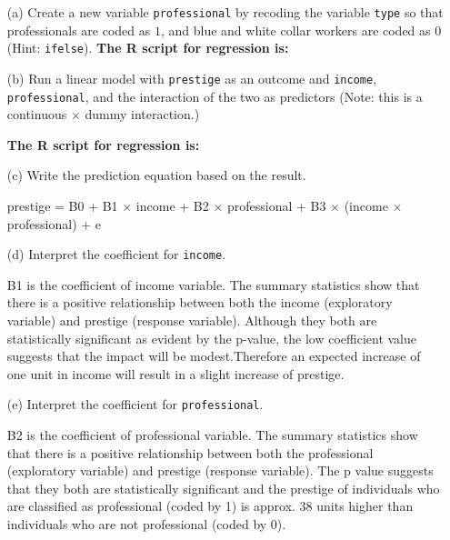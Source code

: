 \documentclass[12pt,letterpaper]{article}
\begin{document}
\newpage
\begin{enumerate}
	
	\item [(a)]
	Create a new variable \texttt{professional} by recoding the variable \texttt{type} so that professionals are coded as $1$, and blue and white collar workers are coded as $0$ (Hint: \texttt{ifelse}).
	\textbf{		The R script for regression is:}		  
	\vspace{1cm}
	
	
	\item [(b)]
	Run a linear model with \texttt{prestige} as an outcome and \texttt{income}, \texttt{professional}, and the interaction of the two as predictors (Note: this is a continuous $\times$ dummy interaction.)
	
	\textbf{		The R script for regression is:}	  
	
	\vspace{1cm}
	\item [(c)]
	Write the prediction equation based on the result.
	\item[] prestige = B0 + B1 × income + B2 × professional + B3 × (income × professional) + e
	\vspace{2cm}
	\item [(d)]
	Interpret the coefficient for \texttt{income}.
	
	\item[] B1 is the coefficient of income variable. The summary statistics show that there is a positive relationship between both the income (exploratory variable) and
	prestige (response variable). Although they both are statistically significant
	as evident by the p-value, the low coefficient value suggests that the impact
	will be modest.Therefore an expected increase of one unit in  income will 
	result in a slight increase of prestige. 
	
	\newpage	
	\item [(e)]
	Interpret the coefficient for \texttt{professional}.
	
	\item[] B2 is the coefficient of professional variable. The summary statistics show that there is a positive relationship between both the professional (exploratory variable) and prestige (response variable). The p value suggests that they both are statistically significant and the prestige of individuals who are classified as professional (coded by 1) is approx. 38 units higher than individuals who are not professional (coded by 0).
	

\end{enumerate}
\end{document}
